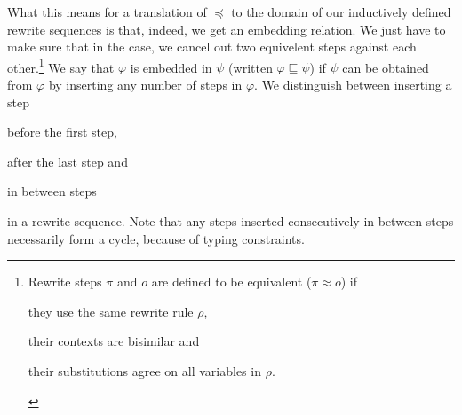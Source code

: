 What this means for a translation of $\preceq$ to the domain of our
inductively defined rewrite sequences is that, indeed, we get an embedding
relation. We just have to make sure that in the
 case, we cancel out two
equivelent steps against each other.\footnote{Rewrite steps $\pi$ and $o$ are
  defined to be equivalent ($\pi \approx o$) if %
\begin{compactenum}
  \item they use the same rewrite rule $\rho$,
  \item their contexts are bisimilar and
  \item their substitutions agree on all variables in $\rho$.
\end{compactenum}}
We say that $\varphi$ is embedded in $\psi$ (written $\varphi
\sqsubseteq \psi$) if $\psi$ can be obtained from $\varphi$ by inserting
any number of steps in $\varphi$. We distinguish between inserting a step
\begin{inparaenum}[(i)]
  \item before the first step,
  \item after the last step and
  \item in between steps
\end{inparaenum}
in a rewrite sequence. Note that any steps inserted consecutively in between
steps necessarily form a cycle, because of typing constraints.
